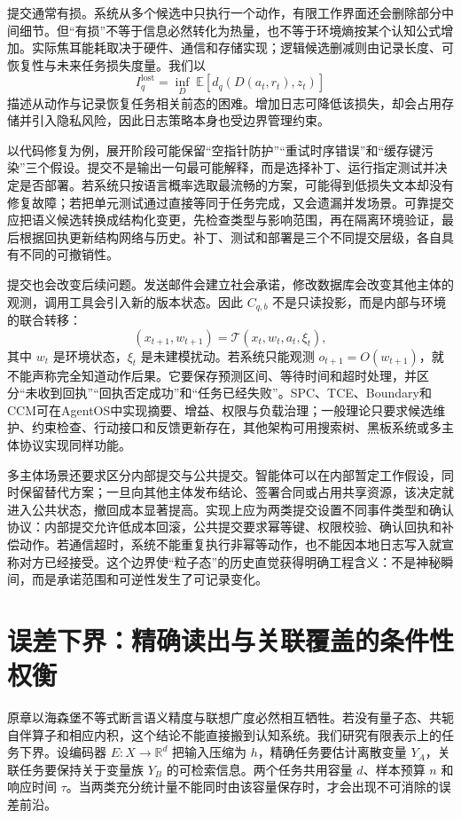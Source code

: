 提交通常有损。系统从多个候选中只执行一个动作，有限工作界面还会删除部分中间细节。但“有损”不等于信息必然转化为热量，也不等于环境熵按某个认知公式增加。实际焦耳能耗取决于硬件、通信和存储实现；逻辑候选删减则由记录长度、可恢复性与未来任务损失度量。我们以
\[
I_q^{\mathrm{lost}}=\inf_D\;\mathbb E[d_q(D(a_t,r_t),z_t)]
\]
描述从动作与记录恢复任务相关前态的困难。增加日志可降低该损失，却会占用存储并引入隐私风险，因此日志策略本身也受边界管理约束。

以代码修复为例，展开阶段可能保留“空指针防护”“重试时序错误”和“缓存键污染”三个假设。提交不是输出一句最可能解释，而是选择补丁、运行指定测试并决定是否部署。若系统只按语言概率选取最流畅的方案，可能得到低损失文本却没有修复故障；若把单元测试通过直接等同于任务完成，又会遗漏并发场景。可靠提交应把语义候选转换成结构化变更，先检查类型与影响范围，再在隔离环境验证，最后根据回执更新结构网络与历史。补丁、测试和部署是三个不同提交层级，各自具有不同的可撤销性。

提交也会改变后续问题。发送邮件会建立社会承诺，修改数据库会改变其他主体的观测，调用工具会引入新的版本状态。因此 $C_{q,b}$ 不是只读投影，而是内部与环境的联合转移：
\[
(x_{t+1},w_{t+1})=\mathcal T(x_t,w_t,a_t,\xi_t),
\]
其中 $w_t$ 是环境状态，$\xi_t$ 是未建模扰动。若系统只能观测 $o_{t+1}=O(w_{t+1})$，就不能声称完全知道动作后果。它要保存预测区间、等待时间和超时处理，并区分“未收到回执”“回执否定成功”和“任务已经失败”。SPC、TCE、Boundary和CCM可在AgentOS中实现摘要、增益、权限与负载治理；一般理论只要求候选维护、约束检查、行动接口和反馈更新存在，其他架构可用搜索树、黑板系统或多主体协议实现同样功能。

多主体场景还要求区分内部提交与公共提交。智能体可以在内部暂定工作假设，同时保留替代方案；一旦向其他主体发布结论、签署合同或占用共享资源，该决定就进入公共状态，撤回成本显著提高。实现上应为两类提交设置不同事件类型和确认协议：内部提交允许低成本回滚，公共提交要求幂等键、权限校验、确认回执和补偿动作。若通信超时，系统不能重复执行非幂等动作，也不能因本地日志写入就宣称对方已经接受。这个边界使“粒子态”的历史直觉获得明确工程含义：不是神秘瞬间，而是承诺范围和可逆性发生了可记录变化。

\section{误差下界：精确读出与关联覆盖的条件性权衡}
\label{sec:section_4248}

原章以海森堡不等式断言语义精度与联想广度必然相互牺牲。若没有量子态、共轭自伴算子和相应内积，这个结论不能直接搬到认知系统。我们研究有限表示上的任务下界。设编码器 $E:X\rightarrow\mathbb R^d$ 把输入压缩为 $h$，精确任务要估计离散变量 $Y_A$，关联任务要保持关于变量族 $Y_B$ 的可检索信息。两个任务共用容量 $d$、样本预算 $n$ 和响应时间 $\tau$。当两类充分统计量不能同时由该容量保存时，才会出现不可消除的误差前沿。

